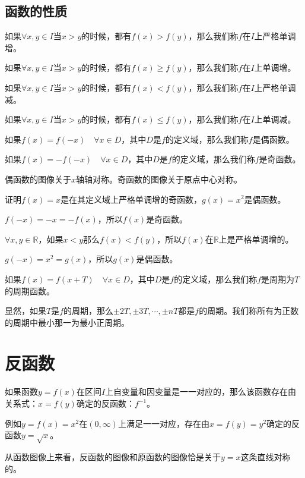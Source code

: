 \subsection{函数的性质}
\begin{definition}[单调性]
    如果$\forall x,y \in I$当$x>y$的时候，都有$f(x)>f(y)$，那么我们称$f$在$I$上严格单调增。

    如果$\forall x,y \in I$当$x>y$的时候，都有$f(x)\geq f(y)$，那么我们称$f$在$I$上单调增。

    如果$\forall x,y \in I$当$x>y$的时候，都有$f(x)<f(y)$，那么我们称$f$在$I$上严格单调减。

    如果$\forall x,y \in I$当$x>y$的时候，都有$f(x)\leq f(y)$，那么我们称$f$在$I$上单调减。
\end{definition}

\begin{definition}[奇偶性]
    如果$f(x)=f(-x)\quad \forall x\in D$，其中$D$是$f$的定义域，那么我们称$f$是偶函数。

    如果$f(x)=-f(-x)\quad \forall x\in D$，其中$D$是$f$的定义域，那么我们称$f$是奇函数。

    偶函数的图像关于$x$轴轴对称。奇函数的图像关于原点中心对称。
\end{definition}
\begin{exercise}
    证明$f(x)=x$是在其定义域上严格单调增的奇函数，$g(x)=x^2$是偶函数。
\end{exercise}
\begin{solution}
    $f(-x)=-x=-f(x)$，所以$f(x)$是奇函数。

    $\forall x,y\in \mathbb{R}$，如果$x<y$那么$f(x)<f(y)$，所以$f(x)$在$\mathbb{R}$上是严格单调增的。

    $g(-x)=x^2=g(x)$，所以$g(x)$是偶函数。
\end{solution}
\begin{definition}[周期性]
    如果$f(x)=f(x+T)\quad \forall x\in D$，其中$D$是$f$的定义域，那么我们称$f$是周期为$T$的周期函数。
\end{definition}
\begin{definition}[最小正周期]
    显然，如果$T$是$f$的周期，那么$\pm2T,\pm3T,\cdots,\pm nT$都是$f$的周期。我们称所有为正数的周期中最小那一为最小正周期。
\end{definition}
\section{反函数}
\begin{definition}[反函数]
    如果函数$y=f(x)$在区间$I$上自变量和因变量是一一对应的，那么该函数存在由关系式：$x=f(y)$确定的反函数：$f^{-1}$。

    例如$y=f(x)=x^2$在$(0,\infty)$上满足一一对应，存在由$x=f(y)=y^2$确定的反函数$y=\sqrt{x}$。
\end{definition}
从函数图像上来看，反函数的图像和原函数的图像恰是关于$y=x$这条直线对称的。
